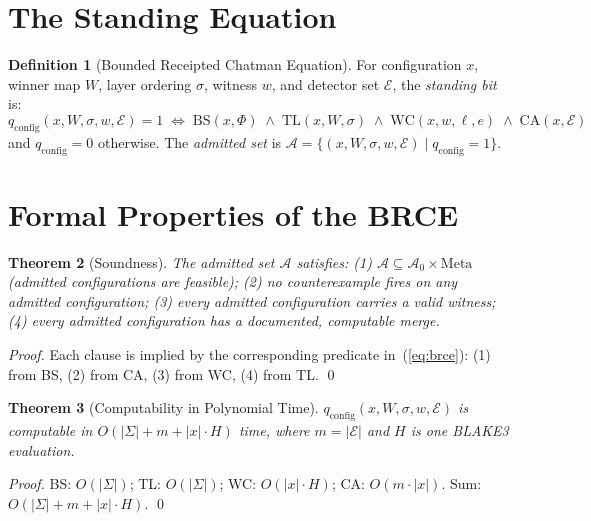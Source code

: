\documentclass[12pt, letterpaper]{report}
\theoremstyle{plain}
\newtheorem{theorem}{Theorem}[chapter]
\theoremstyle{definition}
\newtheorem{definition}[theorem]{Definition}
\theoremstyle{remark}
\newcommand{\EE}{\mathcal{E}}
\newcommand{\qc}{q_{\mathrm{config}}}
\begin{document}
\section{The Standing Equation}

\begin{definition}[Bounded Receipted Chatman Equation]
\label{def:brce}
For configuration $x$, winner map $W$, layer ordering $\sigma$,
witness $w$, and detector set $\EE$,
the \emph{standing bit} is:
\begin{equation}
\boxed{
  \qc(x, W, \sigma, w, \EE) = 1
  \;\iff\;
  \mathrm{BS}(x, \Phi)
  \;\wedge\;
  \mathrm{TL}(x, W, \sigma)
  \;\wedge\;
  \mathrm{WC}(x, w, \ell, e)
  \;\wedge\;
  \mathrm{CA}(x, \EE)
}
\label{eq:brce}
\end{equation}
and $\qc = 0$ otherwise.
The \emph{admitted set} is $\mathcal{A} = \{(x,W,\sigma,w,\EE) \mid \qc = 1\}$.
\end{definition}

\section{Formal Properties of the BRCE}

\begin{theorem}[Soundness]
\label{thm:soundness}
The admitted set $\mathcal{A}$ satisfies:
(1) $\mathcal{A} \subseteq \mathcal{A}_0 \times \mathrm{Meta}$
(admitted configurations are feasible);
(2) no counterexample fires on any admitted configuration;
(3) every admitted configuration carries a valid witness;
(4) every admitted configuration has a documented, computable merge.
\end{theorem}

\begin{proof}
Each clause is implied by the corresponding predicate in~(\ref{eq:brce}):
(1) from BS, (2) from CA, (3) from WC, (4) from TL. \qed
\end{proof}

\begin{theorem}[Computability in Polynomial Time]
\label{thm:complexity}
$\qc(x, W, \sigma, w, \EE)$ is computable in
$O(|\Sigma| + m + |x| \cdot H)$ time,
where $m = |\EE|$ and $H$ is one BLAKE3 evaluation.
\end{theorem}

\begin{proof}
BS: $O(|\Sigma|)$; TL: $O(|\Sigma|)$; WC: $O(|x| \cdot H)$;
CA: $O(m \cdot |x|)$. Sum: $O(|\Sigma| + m + |x| \cdot H)$. \qed
\end{proof}
\end{document}
